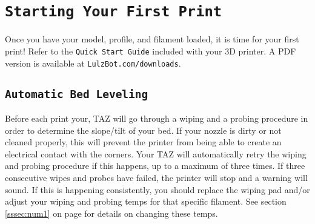 \section{\texttt{Starting Your First Print}}
Once you have your model, profile, and filament loaded, it is time for your first print! Refer to the \texttt{Quick Start Guide} included with your 3D printer. A PDF version is available at \texttt{LulzBot.com/downloads}.

\subsection{\texttt{Automatic Bed Leveling}}
Before each print your, TAZ will go through a wiping and a probing procedure in order to determine the slope/tilt of your bed. If your nozzle is dirty or not cleaned properly, this will prevent the printer from being able to create an electrical contact with the corners. Your TAZ will automatically retry the wiping and probing procedure if this happens, up to a maximum of three times. If three consecutive wipes and probes have failed, the printer will stop and a warning will sound. If this is happening consistently, you should replace the wiping pad and/or adjust your wiping and probing temps for that specific filament. See section \ref{sssec:num1} on page \pageref{sssec:num1} for details on changing these temps.








